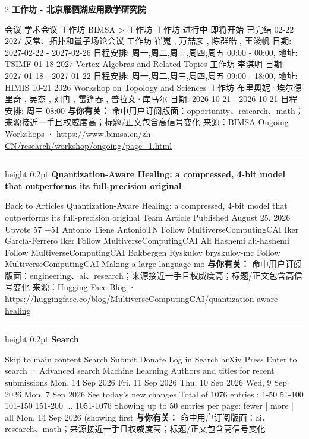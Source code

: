 \documentclass[10.5pt]{ctexart}
\begin{document}
\begin{multicols}{2}
{\large\bfseries 工作坊 - 北京雁栖湖应用数学研究院}\par
会议 学术会议 工作坊 BIMSA > 工作坊 工作坊 进行中 即将开始 已完结 02-22 2027 反常、拓扑和量子场论会议 工作坊 崔嵬 , 万喆彦 , 陈群皓 , 王浚帆 日期: 2027-02-22 - 2027-02-26 日程安排: 周一,周二,周三,周四,周五 00:00 - 00:00, 地址: TSIMF 01-18 2027 Vertex Algebras and Related Topics 工作坊 李淇明 日期: 2027-01-18 - 2027-01-22 日程安排: 周一,周二,周三,周四,周五 09:00 - 18:00, 地址: HIMIS 10-21 2026 Workshop on Topology and Sciences 工作坊 布里奥妮·埃尔德里奇 , 吴杰 , 刘冉 , 雷逢春 , 普拉文·库马尔 日期: 2026-10-21 - 2026-10-21 日程安排: 周三 08:00
\textbf{与你有关：} 命中用户订阅版面：opportunity、research、math；来源接近一手且权威度高；标题/正文包含高信号变化
{\footnotesize\color{ormuted} 来源：BIMSA Ongoing Workshops · \url{https://www.bimsa.cn/zh-CN/research/workshop/ongoing/page_1.html}}
\vspace{2mm}
\hrule height 0.2pt
\vspace{2mm}
{\large\bfseries Quantization-Aware Healing: a compressed, 4-bit model that outperforms its full-precision original}\par
Back to Articles Quantization-Aware Healing: a compressed, 4-bit model that outperforms its full-precision original Team Article Published August 25, 2026 Upvote 57 +51 Antonio Tiene AntonioTN Follow MultiverseComputingCAI Iker García-Ferrero Iker Follow MultiverseComputingCAI Ali Hashemi ali-hashemi Follow MultiverseComputingCAI Bakbergen Ryskulov bryskulov-mc Follow MultiverseComputingCAI Making a large language mo
\textbf{与你有关：} 命中用户订阅版面：engineering、ai、research；来源接近一手且权威度高；标题/正文包含高信号变化
{\footnotesize\color{ormuted} 来源：Hugging Face Blog · \url{https://huggingface.co/blog/MultiverseComputingCAI/quantization-aware-healing}}
\vspace{2mm}
\hrule height 0.2pt
\vspace{2mm}
{\large\bfseries Search}\par
Skip to main content Search Submit Donate Log in Search arXiv Press Enter to search · Advanced search Machine Learning Authors and titles for recent submissions Mon, 14 Sep 2026 Fri, 11 Sep 2026 Thu, 10 Sep 2026 Wed, 9 Sep 2026 Mon, 7 Sep 2026 See today's new changes Total of 1076 entries : 1-50 51-100 101-150 151-200 ... 1051-1076 Showing up to 50 entries per page: fewer | more | all Mon, 14 Sep 2026 (showing first 
\textbf{与你有关：} 命中用户订阅版面：ai、research、math；来源接近一手且权威度高；标题/正文包含高信号变化

\end{multicols}
\end{document}
